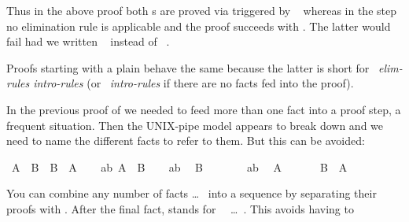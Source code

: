 \begin{isabellebody}
\begin{isamarkuptext}
Thus in the above proof both s are proved via
 triggered by ~ whereas
in the  step no elimination rule is applicable and
the proof succeeds with . The latter would fail had
we written ~ instead of
~.

Proofs starting with a plain  behave the same because the
latter is short for ~\textit{elim-rules
intro-rules}\isa{{\isacharparenright}} (or ~\textit{intro-rules}\isa{{\isacharparenright}} if there are no facts fed into
the proof).%
\end{isamarkuptext}%
\isamarkuptrue%
%
\isamarkuptrue%
%
\begin{isamarkuptext}%
In the previous proof of  we needed to feed
more than one fact into a proof step, a frequent situation. Then the
UNIX-pipe model appears to break down and we need to name the different
facts to refer to them. But this can be avoided:%
\end{isamarkuptext}%
\isamarkuptrue%
\ {\isachardoublequote}A\ {\isasymand}\ B\ {\isasymlongrightarrow}\ B\ {\isasymand}\ A{\isachardoublequote}\isanewline
\isamarkupfalse%
\isanewline
\ \ \isamarkupfalse%
\ ab{\isacharcolon}\ {\isachardoublequote}A\ {\isasymand}\ B{\isachardoublequote}\isanewline
\ \ \isamarkupfalse%
\ ab\ \isamarkupfalse%
\ {\isachardoublequote}B{\isachardoublequote}\ \isamarkupfalse%
\isacommand{{\isachardot}{\isachardot}}\isanewline
\ \ \isamarkupfalse%
\isanewline
\ \ \isamarkupfalse%
\ ab\ \isamarkupfalse%
\ {\isachardoublequote}A{\isachardoublequote}\ \isamarkupfalse%
\isacommand{{\isachardot}{\isachardot}}\isanewline
\ \ \isamarkupfalse%
\ \isamarkupfalse%
\ {\isachardoublequote}B\ {\isasymand}\ A{\isachardoublequote}\ \isamarkupfalse%
\isacommand{{\isachardot}{\isachardot}}\isanewline
\isamarkupfalse%
\isamarkupfalse%
%
\begin{isamarkuptext}%
\noindent You can combine any number of facts  \dots\  into a sequence by separating their proofs with
. After the final fact,  stands
for ~~\dots~.  This avoids having to

\end{isamarkuptext}
\end{isabellebody}
